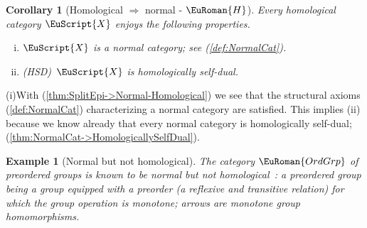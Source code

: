 \documentclass [12pt,oneside]{book}%
\makeatletter
\theoremstyle{captionstyle}  %
\newtheorem{corollary}[theorem]{Corollary}
\newtheorem{example}[theorem]{Example}
\renewenvironment{proof}[1][\proofname]{\vspace{-2ex}\par       %
	\pushQED{\qed}%
	\normalfont \topsep6\p@\@plus6\p@\relax
	\trivlist
	\item[\hskip\labelsep
	            \color{proofcaption}\bfseries                %
	            #1\@addpunct{\quad}]\ignorespaces
}{%
	\popQED\endtrivlist\@endpefalse
}
\newenvironment{thmlist}{		%
	\begin{enumerate}[(i)]}{
	\end{enumerate}
}
\newcommand{\OrdGrp}{\ensuremath{\EuRoman{OrdGrp}}}
\newcommand{\Ctgry}[1]{\EuScript{#1}}					%
\newcommand{\HTag}{ - {\color{Brown} $\EuRoman{H}$}}																					%
\newcommand{\HSDInline}{(HSD)}																%
\makeatother
\begin{document}
\begin{corollary}[Homological $\Rightarrow$ normal\HTag]
    \label{thm:HomologicalCat->NormalCat}%
    Every homological category $\Ctgry{X}$ enjoys the following properties.
    \begin{thmlist}
        \item $\Ctgry{X}$ is a normal category; see (\ref{def:NormalCat}).
        \item \HSDInline\ $\Ctgry{X}$ is homologically self-dual.
    \end{thmlist}
\end{corollary}
\begin{proof}
    (i)\quad With (\ref{thm:SplitEpi->Normal-Homological}) we see that the structural axioms (\ref{def:NormalCat}) characterizing a normal category are satisfied. This implies (ii) because we know already that every normal category is homologically self-dual;  (\ref{thm:NormalCat->HomologicallySelfDual}).
\end{proof}


\begin{example}[Normal but not homological]\label{exa:Normal-Not-Homological}
    The category $\OrdGrp$ of preordered groups is known to be normal but not homological~\cite{MR3958089}: a preordered group being a group equipped with a preorder (a reflexive and transitive relation) for which the group operation is monotone; arrows are monotone group homomorphisms.
\end{example}
\end{document}
